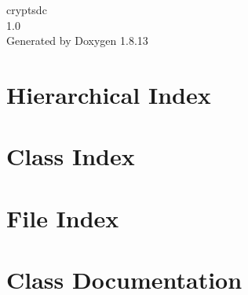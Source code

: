 \documentclass[twoside]{book}
\newcommand{\+}{\discretionary{\mbox{\scriptsize$\hookleftarrow$}}{}{}}
\newcommand{\clearemptydoublepage}{%
  \newpage{\pagestyle{empty}\cleardoublepage}%
}
\begin{document}
\hypersetup{pageanchor=false,
             bookmarksnumbered=true,
             pdfencoding=unicode
            }
\begin{titlepage}
\vspace*{7cm}
\begin{center}%
{\Large cryptsdc \\[1ex]\large 1.\+0 }\\
\vspace*{1cm}
{\large Generated by Doxygen 1.8.13}\\
\end{center}
\end{titlepage}
\clearemptydoublepage
{}
\tableofcontents
\clearemptydoublepage
{}
\hypersetup{pageanchor=true}

\chapter{Hierarchical Index}

\chapter{Class Index}

\chapter{File Index}

\chapter{Class Documentation}


























\end{document}
